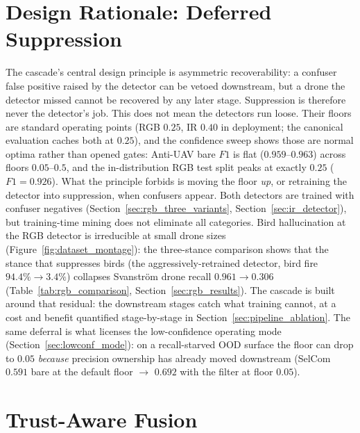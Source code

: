 \section{Design Rationale: Deferred Suppression}
\label{sec:design_rationale}

The cascade's central design principle is asymmetric recoverability: a confuser false positive raised by the detector can be vetoed downstream, but a drone the detector missed cannot be recovered by any later stage. Suppression is therefore never the detector's job. This does not mean the detectors run loose. Their floors are standard operating points (RGB $0.25$, IR $0.40$ in deployment; the canonical evaluation caches both at $0.25$), and the confidence sweep shows those are normal optima rather than opened gates: Anti-UAV bare $F1$ is flat ($0.959$--$0.963$) across floors $0.05$--$0.5$, and the in-distribution RGB test split peaks at exactly $0.25$ ($F1=0.926$). What the principle forbids is moving the floor \emph{up}, or retraining the detector into suppression, when confusers appear. Both detectors are trained with confuser negatives (Section~\ref{sec:rgb_three_variants}, Section~\ref{sec:ir_detector}), but training-time mining does not eliminate all categories. Bird hallucination at the RGB detector is irreducible at small drone sizes (Figure~\ref{fig:dataset_montage}): the three-stance comparison shows that the stance that suppresses birds (the aggressively-retrained detector, bird fire $94.4\% \to 3.4\%$) collapses Svanstr\"om drone recall $0.961 \to 0.306$ (Table~\ref{tab:rgb_comparison}, Section~\ref{sec:rgb_results}). The cascade is built around that residual: the downstream stages catch what training cannot, at a cost and benefit quantified stage-by-stage in Section~\ref{sec:pipeline_ablation}. The same deferral is what licenses the low-confidence operating mode (Section~\ref{sec:lowconf_mode}): on a recall-starved OOD surface the floor can drop to $0.05$ \emph{because} precision ownership has already moved downstream (SelCom $0.591$ bare at the default floor $\to$ $0.692$ with the filter at floor $0.05$).

\section{Trust-Aware Fusion}
\label{sec:trust_fusion}

